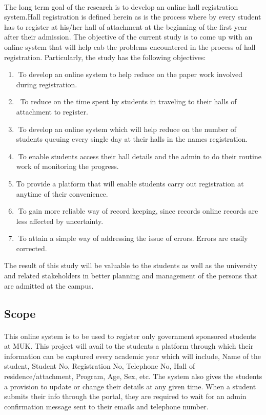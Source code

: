 \documentclass[12pt]{article}
\begin{document}
		\paragraph{}
	The long term goal of the research is to develop an online hall registration system.Hall registration is defined herein as is the process where by every student has to register at his/her hall of attachment at the beginning of the first year after their admission. The objective of the current study is to come up with an online system that will help cab the problems encountered in the process of hall registration. Particularly, the study has the following objectives:
	\begin{enumerate}
		
    \itemTo develop an online system to help reduce on the paper work involved during registration.
     \itemTo reduce on the time spent by students in traveling to their halls of attachment to register.
      \itemTo develop an online system which will help reduce on the number of students queuing every single day at their halls in the names registration.
      \itemTo enable students access their hall details and the admin to do their routine work of monitoring the progress.
       \item To provide a platform that will enable students carry out registration at anytime of their convenience. 
       \itemTo gain more reliable way of record keeping, since records online records are less affected by uncertainty.
       \itemTo attain a simple way of addressing the issue of errors. Errors are easily corrected.
       
	\end{enumerate}
The result of this study will be valuable to the students as well
as the university and related stakeholders in better planning and management of the persons that are admitted at the campus.
	\subsection{Scope}
		\paragraph{}
	This online system is to be used to register only government sponsored students at MUK.
	This project will avail to the students a platform through which their information can be captured every academic year which will include, Name of the student, Student No, Registration No, Telephone No, Hall of residence/attachment, Program, Age, Sex, etc.
	The system also gives the students a provision to update or change their details at any given time.
	When a student submits their info through the portal, they are required to wait for an admin confirmation message sent to their emails and telephone number.
	
\end{document}
